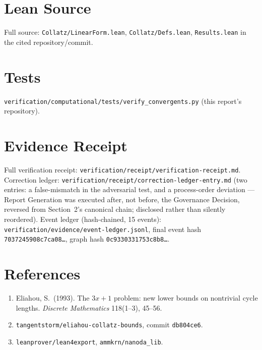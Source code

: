 \documentclass[11pt]{article}
\begin{document}
\appendix
\section{Lean Source}
Full source: \texttt{Collatz/LinearForm.lean}, \texttt{Collatz/Defs.lean}, \texttt{Results.lean} in the cited repository/commit.

\section{Tests}
\texttt{verification/computational/tests/verify\_convergents.py} (this report's repository).

\section{Evidence Receipt}
Full verification receipt: \texttt{verification/receipt/verification-receipt.md}. Correction ledger: \texttt{verification/receipt/correction-ledger-entry.md} (two entries: a false-mismatch in the adversarial test, and a process-order deviation --- Report Generation was executed after, not before, the Governance Decision, reversed from Section~2's canonical chain; disclosed rather than silently reordered). Event ledger (hash-chained, 15 events): \texttt{verification/evidence/event-ledger.jsonl}, final event hash \texttt{7037245908c7ca08\ldots}, graph hash \texttt{0c9330331753c8b8\ldots}.

\section*{References}
\begin{enumerate}
\item Eliahou, S.\ (1993). The $3x+1$ problem: new lower bounds on nontrivial cycle lengths. \emph{Discrete Mathematics} 118(1--3), 45--56.
\item \texttt{tangentstorm/eliahou-collatz-bounds}, commit \texttt{db804ce6}.
\item \texttt{leanprover/lean4export}, \texttt{ammkrn/nanoda\_lib}.
\end{enumerate}
\end{document}

